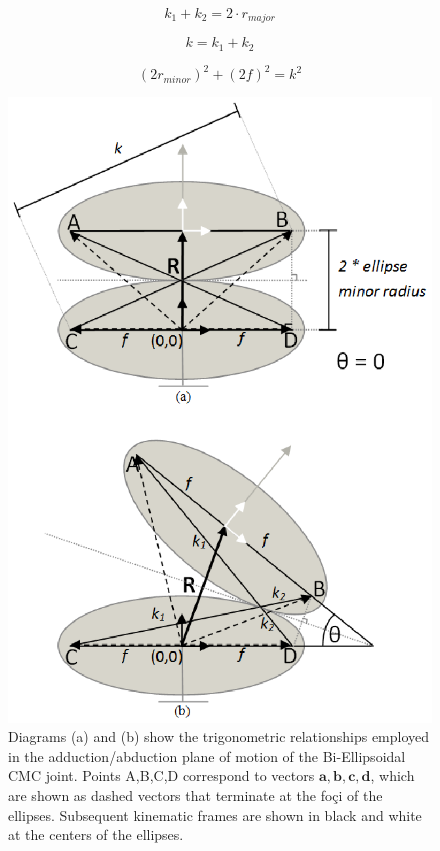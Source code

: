 \documentclass[journal]{IEEEtran}
\begin{document}
\begin{equation} 
k_{1} + k_{2} = 2\cdot r_{major}
\label{garden}
\end{equation}

\begin{equation} 
k = k_{1} + k_{2} %
\label{eqk}
\end{equation}

\begin{equation} 
(2 r_{minor})^{2} + (2 f)^{2} = k^{2}
\label{pythagarino}
\end{equation}

\begin{figure}
	\centering
	\includegraphics[width = 0.9\columnwidth]{figures/starry3.eps}
	\caption{Diagrams (a) and (b) show the trigonometric relationships employed in the adduction/abduction plane of motion of the Bi-Ellipsoidal CMC joint. Points A,B,C,D correspond to vectors $\mathbf{a,b,c,d}$, which are shown as dashed vectors that terminate at the foçi of the ellipses. Subsequent kinematic frames are shown in black and white at the centers of the ellipses. 
	}\label{spacesymbol}
\end{figure}
\end{document}
